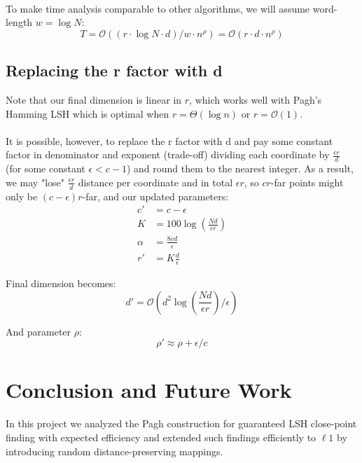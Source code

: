 \documentclass{scrartcl}
\newcommand{\BO}{{\mathcal{O}}}
\begin{document}
\paragraph{}
To make time analysis comparable to other algorithms, we will assume word-length $w=\log N$:
$$T = \BO((r\cdot \log{N} \cdot d)/w \cdot n^{\rho}) = \BO(r \cdot d \cdot n^{\rho})$$

\subsection{Replacing the r factor with d}
Note that our final dimension is linear in $r$, which works well with Pagh's Hamming LSH which is optimal when $r = \Theta(\log n)$ or $r=\BO(1)$.
\paragraph{}
It is possible, however, to replace the r factor with d and pay some constant factor in denominator and exponent (trade-off) dividing each coordinate by $\tfrac{\epsilon r}{d}$ (for some constant $\epsilon < c - 1$) and round them to the nearest integer.\newline
As a result, we may "lose" $\tfrac{\epsilon r}{d}$ distance per coordinate and in total $\epsilon r$, so $cr$-far points might only be $(c-\epsilon)r$-far, and our updated parameters:
\begin{align*} 
c'&=c-\epsilon \\
K &= 100\log(\frac{Nd}{\epsilon r}) \\
\alpha &= \frac{8cd}{\epsilon} \\
r' &= K\frac{d}{\epsilon}
\end{align*}

Final dimension becomes: 
$$d' = \BO(d^2\log(\frac{Nd}{\epsilon r})/\epsilon)$$ 

And parameter $\rho$:
$$\rho' \approx \rho + \epsilon/c$$




\section{Conclusion and Future Work}
In this project we analyzed the Pagh construction for guaranteed LSH close-point finding with expected efficiency and extended such findings efficiently to $\ell1$ by introducing random distance-preserving mappings. 
\end{document}
